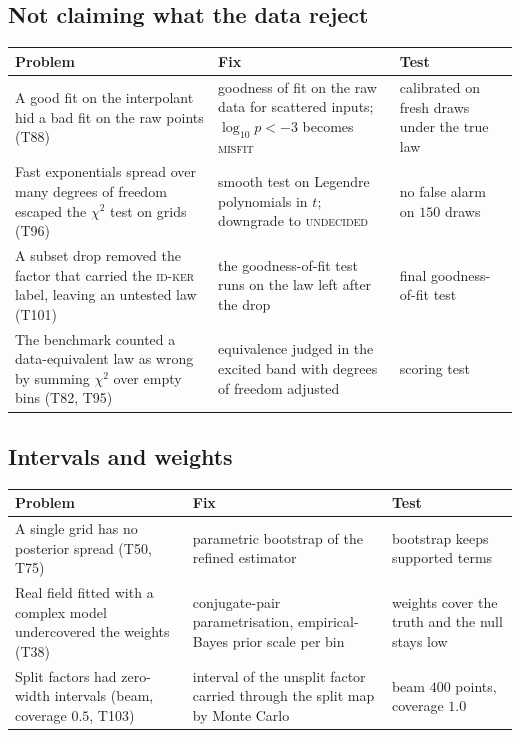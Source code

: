 \documentclass[11pt,a4paper]{article}
\theoremstyle{definition}
\begin{document}
\subsection{Not claiming what the data reject}
\begin{center}\small
\begin{tabular}{@{}L{4.1cm}L{4.4cm}L{4.4cm}@{}}
\toprule
Problem & Fix & Test\\\midrule
A good fit on the interpolant hid a bad fit on the raw points (T88) & goodness of fit on the raw data for scattered inputs; $\log_{10}p<-3$ becomes \textsc{misfit} & calibrated on fresh draws under the true law\\
Fast exponentials spread over many degrees of freedom escaped the $\chi^2$ test on grids (T96) & smooth test on Legendre polynomials in $t$; downgrade to \textsc{undecided} & no false alarm on $150$ draws\\
A subset drop removed the factor that carried the \textsc{id-ker} label, leaving an untested law (T101) & the goodness-of-fit test runs on the law left after the drop & final goodness-of-fit test\\
The benchmark counted a data-equivalent law as wrong by summing $\chi^2$ over empty bins (T82, T95) & equivalence judged in the excited band with degrees of freedom adjusted & scoring test\\
\bottomrule
\end{tabular}
\end{center}

\subsection{Intervals and weights}
\begin{center}\small
\begin{tabular}{@{}L{4.1cm}L{4.4cm}L{4.4cm}@{}}
\toprule
Problem & Fix & Test\\\midrule
A single grid has no posterior spread (T50, T75) & parametric bootstrap of the refined estimator & bootstrap keeps supported terms\\
Real field fitted with a complex model undercovered the weights (T38) & conjugate-pair parametrisation, empirical-Bayes prior scale per bin & weights cover the truth and the null stays low\\
Split factors had zero-width intervals (beam, coverage $0.5$, T103) & interval of the unsplit factor carried through the split map by Monte Carlo & beam $400$ points, coverage $1.0$\\
\bottomrule
\end{tabular}
\end{center}
\end{document}

